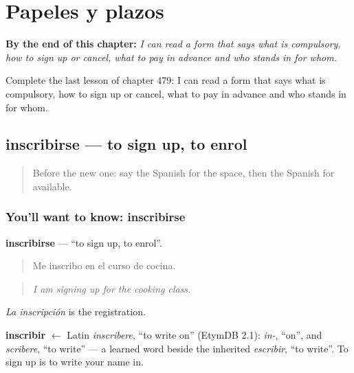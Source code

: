 
\chapter{Papeles y plazos}
\label{ch:es-papeles-y-plazos}

\begin{chapteropening}
\textbf{By the end of this chapter:} \emph{I can read a form that says what is compulsory, how to sign up or cancel, what to pay in advance and who stands in for whom.}

Complete the last lesson of chapter 479: I can read a form that says what is compulsory, how to sign up or cancel, what to pay in advance and who stands in for whom.
\end{chapteropening}

\section[inscribirse]{inscribirse — to sign up, to enrol}

\label{lesson:ES-C479-inscribirse}



\begin{quote}
Before the new one: say the Spanish for the space, then the Spanish for available.
\end{quote}

\subsection*{You'll want to know: inscribirse}
\textbf{inscribirse} — \textquotedblleft{}to sign up, to enrol\textquotedblright{}.

\begin{quote}
Me inscribo en el curso de cocina.
\end{quote}

\begin{quote}
\emph{I am signing up for the cooking class.}
\end{quote}

\emph{La inscripción} is the registration.

\begin{cousinweb}
\textbf{inscribir} $\leftarrow$ Latin \emph{inscribere}, \textquotedblleft{}to write on\textquotedblright{} (EtymDB 2.1): \emph{in-}, \textquotedblleft{}on\textquotedblright{}, and \emph{scribere}, \textquotedblleft{}to write\textquotedblright{} — a learned word beside the inherited \emph{escribir}, \textquotedblleft{}to write\textquotedblright{}. To sign up is to write your name in.
\end{cousinweb}

